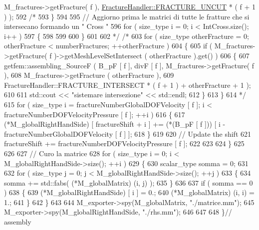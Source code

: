 \begin{DoxyCode}
      M\_fractures->getFracture( f ), \hyperlink{classFractureHandler_a495ad4fc72d0c47c8f0424842f1153aaaa992cc3ad024a030ecd798dc319c95ac}{FractureHandler::FRACTURE\_UNCUT} * ( f + 1 ) );
592 \textcolor{comment}{/*}
593 \textcolor{comment}{    \}}
594 \textcolor{comment}{    }
595 \textcolor{comment}{    // Aggiorno prima le matrici di tutte le fratture che si intersecano formando un " Cross "}
596 \textcolor{comment}{    for ( size\_type i = 0; i < IntCross.size(); i++ )}
597 \textcolor{comment}{    \{}
598 \textcolor{comment}{        }
599 \textcolor{comment}{        }
600 \textcolor{comment}{    \}}
601 \textcolor{comment}{}
602 \textcolor{comment}{*/}     \textcolor{comment}{/*}
603 \textcolor{comment}{       for ( size\_type otherFracture = 0; otherFracture < numberFractures; ++otherFracture )}
604 \textcolor{comment}{        \{}
605 \textcolor{comment}{            if ( M\_fractures->getFracture( f )->getMeshLevelSetIntersect ( otherFracture ).get() )}
606 \textcolor{comment}{            \{}
607 \textcolor{comment}{                getfem::assembling\_SourceF ( B\_pF [ f ], divF [ f ], M\_fractures->getFracture( f ),}
608 \textcolor{comment}{                                             M\_fractures->getFracture ( otherFracture ),}
609 \textcolor{comment}{                                             FractureHandler::FRACTURE\_INTERSECT * ( f + 1 ) +
       otherFracture + 1 );}
610 \textcolor{comment}{                                             }
611 \textcolor{comment}{                std::cout << "sistemare intersezione" << std::endl;}
612 \textcolor{comment}{            \}}
613 \textcolor{comment}{        \}}
614 \textcolor{comment}{*/}
615         \textcolor{keywordflow}{for} ( size\_type i = fractureNumberGlobalDOFVelocity [ f ]; i < fractureNumberDOFVelocityPressure [ 
      f ]; ++i )
616         \{
617                 (*M\_globalRightHandSide) [ fractureShift + i ] += (*(B\_pF [ f ])) [ i - 
      fractureNumberGlobalDOFVelocity [ f ] ];
618         \}
619         
620         \textcolor{comment}{// Update the shift}
621         fractureShift += fractureNumberDOFVelocityPressure [ f ];
622 
623 
624     \}
625 
626 
627     \textcolor{comment}{// Curo la matrice}
628     \textcolor{keywordflow}{for} ( size\_type i = 0; i < M\_globalRightHandSide->size(); ++i )
629     \{
630         scalar\_type somma = 0;
631 
632         \textcolor{keywordflow}{for} ( size\_type j = 0; j < M\_globalRightHandSide->size(); ++j )
633         \{
634             somma += std::fabs( (*M\_globalMatrix) (i, j) );
635         \}
636 
637         \textcolor{keywordflow}{if} ( somma == 0 )
638         \{
639             (*M\_globalRightHandSide) [ i ] = 0.;
640             (*M\_globalMatrix) (i, i) = 1.;
641         \}
642     \}
643 
644     M\_exporter->spy(M\_globalMatrix, \textcolor{stringliteral}{"./matrice.mm"});
645     M\_exporter->spy(M\_globalRightHandSide, \textcolor{stringliteral}{"./rhs.mm"});
646 
647     
648 \}\textcolor{comment}{// assembly}
\end{DoxyCode}
